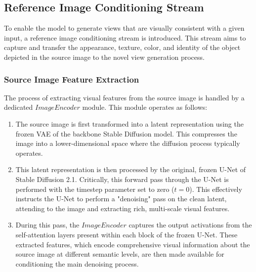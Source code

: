 \subsection{Reference Image Conditioning Stream}
To enable the model to generate views that are visually consistent with a given input, a reference image conditioning stream is introduced. This stream aims to capture and transfer the appearance, texture, color, and identity of the object depicted in the source image to the novel view generation process.

\subsubsection{Source Image Feature Extraction}
The process of extracting visual features from the source image is handled by a dedicated $ImageEncoder$ module. This module operates as follows:
\begin{enumerate}
  \item The source image is first transformed into a latent representation using the frozen VAE of the backbone Stable Diffusion model. This compresses the image into a lower-dimensional space where the diffusion process typically operates.
  \item This latent representation is then processed by the original, frozen U-Net of Stable Diffusion 2.1. Critically, this forward pass through the U-Net is performed with the timestep parameter set to zero ($t=0$). This effectively instructs the U-Net to perform a "denoising" pass on the clean latent, attending to the image and extracting rich, multi-scale visual features.
  \item During this pass, the $ImageEncoder$ captures the output activations from the self-attention layers present within each block of the frozen U-Net. These extracted features, which encode comprehensive visual information about the source image at different semantic levels, are then made available for conditioning the main denoising process.
\end{enumerate}


